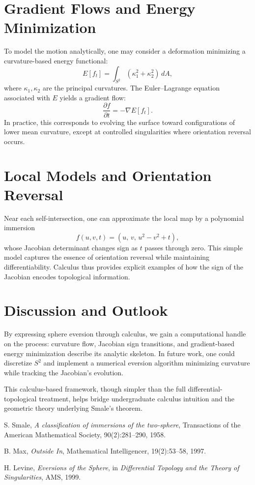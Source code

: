 \documentclass[12pt]{article}
\begin{document}
\section{Gradient Flows and Energy Minimization}
To model the motion analytically, one may consider a deformation minimizing a curvature-based energy functional:
\[
E[f_t] = \int_{S^2} \left( \kappa_1^2 + \kappa_2^2 \right) \, dA,
\]
where \( \kappa_1, \kappa_2 \) are the principal curvatures. The Euler–Lagrange equation associated with \( E \) yields a gradient flow:
\[
\frac{\partial f}{\partial t} = - \nabla E[f_t].
\]
In practice, this corresponds to evolving the surface toward configurations of lower mean curvature, except at controlled singularities where orientation reversal occurs.

\section{Local Models and Orientation Reversal}
Near each self-intersection, one can approximate the local map by a polynomial immersion
\[
f(u,v,t) = (u,\, v,\, u^2 - v^2 + t),
\]
whose Jacobian determinant changes sign as \( t \) passes through zero. This simple model captures the essence of orientation reversal while maintaining differentiability. Calculus thus provides explicit examples of how the sign of the Jacobian encodes topological information.

\section{Discussion and Outlook}
By expressing sphere eversion through calculus, we gain a computational handle on the process: curvature flow, Jacobian sign transitions, and gradient-based energy minimization describe its analytic skeleton. In future work, one could discretize \( S^2 \) and implement a numerical eversion algorithm minimizing curvature while tracking the Jacobian’s evolution.

This calculus-based framework, though simpler than the full differential-topological treatment, helps bridge undergraduate calculus intuition and the geometric theory underlying Smale’s theorem.

\begin{thebibliography}{9}
S. Smale, \textit{A classification of immersions of the two-sphere}, Transactions of the American Mathematical Society, 90(2):281–290, 1958.

B. Max, \textit{Outside In}, Mathematical Intelligencer, 19(2):53–58, 1997.

H. Levine, \textit{Eversions of the Sphere}, in \emph{Differential Topology and the Theory of Singularities}, AMS, 1999.
\end{thebibliography}
\end{document}
